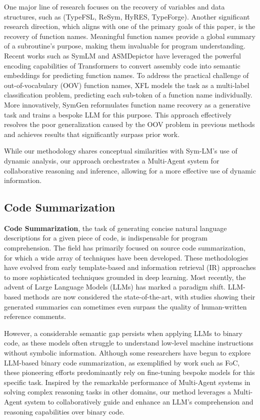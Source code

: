 \documentclass[acmsmall,screen,review,anonymous]{acmart} %
\begin{document}
One major line of research focuses on the recovery of variables and data structures, such as (TypeFSL, ReSym, HyRES, TypeForge). Another significant research direction, which aligns with one of the primary goals of this paper, is the recovery of function names. Meaningful function names provide a global summary of a subroutine's purpose, making them invaluable for program understanding. Recent works such as SymLM and ASMDepictor have leveraged the powerful encoding capabilities of Transformers to convert assembly code into semantic embeddings for predicting function names. To address the practical challenge of out-of-vocabulary (OOV) function names, XFL models the task as a multi-label classification problem, predicting each sub-token of a function name individually. More innovatively, SymGen reformulates function name recovery as a generative task and trains a bespoke LLM for this purpose. This approach effectively resolves the poor generalization caused by the OOV problem in previous methods and achieves results that significantly surpass prior work.

While our methodology shares conceptual similarities with Sym-LM's use of dynamic analysis, our approach orchestrates a Multi-Agent system for collaborative reasoning and inference, allowing for a more effective use of dynamic information.

\subsection{Code Summarization}
\textbf{Code Summarization}, the task of generating concise natural language descriptions for a given piece of code, is indispensable for program comprehension. The field has primarily focused on source code summarization, for which a wide array of techniques have been developed. These methodologies have evolved from early template-based and information retrieval (IR) approaches to more sophisticated techniques grounded in deep learning. Most recently, the advent of Large Language Models (LLMs) has marked a paradigm shift. LLM-based methods are now considered the state-of-the-art, with studies showing their generated summaries can sometimes even surpass the quality of human-written reference comments.

However, a considerable semantic gap persists when applying LLMs to binary code, as these models often struggle to understand low-level machine instructions without symbolic information. Although some researchers have begun to explore LLM-based binary code summarization, as exemplified by work such as FoC, these pioneering efforts predominantly rely on fine-tuning bespoke models for this specific task. Inspired by the remarkable performance of Multi-Agent systems in solving complex reasoning tasks in other domains, our method leverages a Multi-Agent system to collaboratively guide and enhance an LLM's comprehension and reasoning capabilities over binary code.
\end{document}
